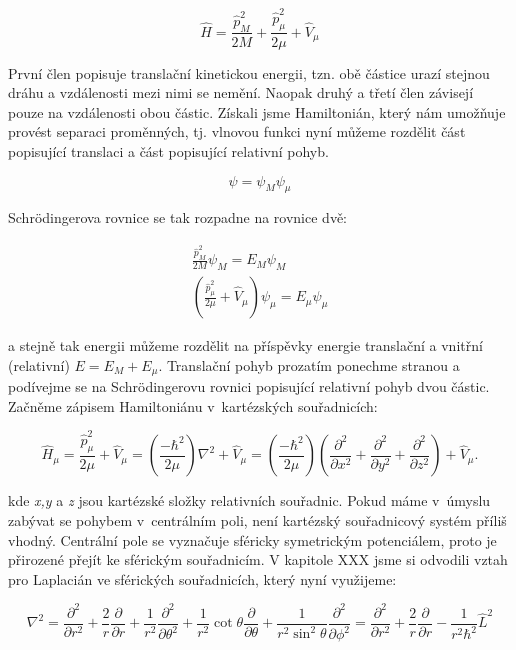 \begin{equation}
\hat{H}=\frac{{\hat{p}}_{M}^{2}}{2M}+\frac{{\hat{p}}_{\mu}^{2}}{2\mu}+\hat{V}_{\mu}
\end{equation}

První člen popisuje translační kinetickou energii, tzn. obě částice urazí stejnou dráhu a vzdálenosti mezi nimi se nemění. Naopak druhý a třetí člen závisejí pouze na vzdálenosti obou částic. Získali jsme Hamiltonián, který nám umožňuje provést separaci proměnných, tj. vlnovou funkci nyní můžeme rozdělit část popisující translaci a část popisující relativní pohyb. 

\begin{equation}
\psi=\psi_{M}\psi_{\mu}
\end{equation}

Schr\"odingerova rovnice se tak rozpadne na  rovnice dvě:

\begin{eqnarray}
\frac{{\hat{p}}_{M}^{2}}{2M}\psi_{M}=E_{M}\psi_{M}
\label{rov:2č-schr-trans}
\\
\left(\frac{{\hat{p}}_{\mu}^{2}}{2\mu}+\hat{V}_{\mu}\right)\psi_{\mu}=E_{\mu}\psi_{\mu}
\label{rov:2č-schr-vibr}
\end{eqnarray}

a stejně tak energii můžeme rozdělit na příspěvky energie translační a vnitřní (relativní) $ E=E_{M}+E_{\mu} $. Translační pohyb prozatím ponechme stranou a podívejme se na Schr\"odingerovu rovnici popisující relativní pohyb dvou částic. Začněme zápisem Hamiltoniánu v~kartézských souřadnicích:

\begin{equation}
\hat{H}_{\mu}=\frac{{\hat{p}}_{\mu}^{2}}{2\mu}+\hat{V}_{\mu}=\left(\frac{-\hbar^{2}}{2\mu}\right)\nabla^{2}+\hat{V}_{\mu}=\left(\frac{-\hbar^{2}}{2\mu}\right)\left(\frac{\partial^{2}}{\partial x^{2}}+\frac{\partial^{2}}{\partial y^{2}}+\frac{\partial^{2}}{\partial z^{2}}\right)+\hat{V}_{\mu}.
\label{rov:2č-SferHamil}
\end{equation}

\noindent kde \textit{x,y} a \textit{z} jsou kartézské složky relativních souřadnic. Pokud máme v~úmyslu zabývat se pohybem v~centrálním poli, není kartézský souřadnicový systém příliš vhodný. Centrální pole se vyznačuje sféricky symetrickým potenciálem, proto je přirozené přejít ke sférickým souřadnicím. {\color{red}V kapitole XXX} jsme si odvodili vztah pro Laplacián ve sférických souřadnicích, který nyní využijeme:

\begin{equation}
\nabla^{2}=\frac{\partial^{2}}{\partial r^{2}}+\frac{2}{r}\frac{\partial}{\partial r}+\frac{1}{r^{2}}\frac{\partial^{2}}{\partial \theta^{2}}+\frac{1}{r^{2}}\cot\theta\frac{\partial}{\partial \theta}+\frac{1}{r^2\sin^2\theta}\frac{\partial^{2}}{\partial \phi^{2}}=\frac{\partial^{2}}{\partial r^{2}}+\frac{2}{r}\frac{\partial}{\partial r}-\frac{1}{r^2\hbar^2}\hat{L}^2
\label{rov:2č-Momenthybnosti}
\end{equation}

